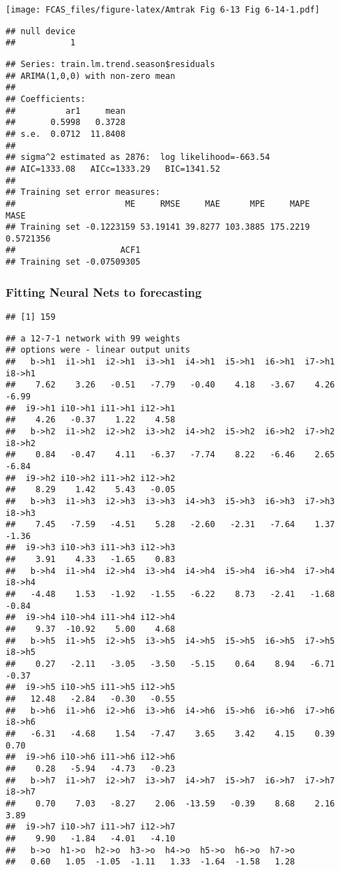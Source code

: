 \documentclass[]{article}
\begin{document}
\texttt{[image: FCAS\_files/figure-latex/Amtrak Fig 6-13 Fig 6-14-1.pdf]}

\begin{verbatim}
## null device 
##           1
\end{verbatim}

\begin{verbatim}
## Series: train.lm.trend.season$residuals 
## ARIMA(1,0,0) with non-zero mean 
## 
## Coefficients:
##          ar1     mean
##       0.5998   0.3728
## s.e.  0.0712  11.8408
## 
## sigma^2 estimated as 2876:  log likelihood=-663.54
## AIC=1333.08   AICc=1333.29   BIC=1341.52
## 
## Training set error measures:
##                      ME     RMSE     MAE      MPE     MAPE      MASE
## Training set -0.1223159 53.19141 39.8277 103.3885 175.2219 0.5721356
##                     ACF1
## Training set -0.07509305
\end{verbatim}

\subsubsection{Fitting Neural Nets to
forecasting}\label{fitting-neural-nets-to-forecasting}

\begin{verbatim}
## [1] 159
\end{verbatim}

\begin{verbatim}
## a 12-7-1 network with 99 weights
## options were - linear output units 
##   b->h1  i1->h1  i2->h1  i3->h1  i4->h1  i5->h1  i6->h1  i7->h1  i8->h1 
##    7.62    3.26   -0.51   -7.79   -0.40    4.18   -3.67    4.26   -6.99 
##  i9->h1 i10->h1 i11->h1 i12->h1 
##    4.26   -0.37    1.22    4.58 
##   b->h2  i1->h2  i2->h2  i3->h2  i4->h2  i5->h2  i6->h2  i7->h2  i8->h2 
##    0.84   -0.47    4.11   -6.37   -7.74    8.22   -6.46    2.65   -6.84 
##  i9->h2 i10->h2 i11->h2 i12->h2 
##    8.29    1.42    5.43   -0.05 
##   b->h3  i1->h3  i2->h3  i3->h3  i4->h3  i5->h3  i6->h3  i7->h3  i8->h3 
##    7.45   -7.59   -4.51    5.28   -2.60   -2.31   -7.64    1.37   -1.36 
##  i9->h3 i10->h3 i11->h3 i12->h3 
##    3.91    4.33   -1.65    0.83 
##   b->h4  i1->h4  i2->h4  i3->h4  i4->h4  i5->h4  i6->h4  i7->h4  i8->h4 
##   -4.48    1.53   -1.92   -1.55   -6.22    8.73   -2.41   -1.68   -0.84 
##  i9->h4 i10->h4 i11->h4 i12->h4 
##    9.37  -10.92    5.00    4.68 
##   b->h5  i1->h5  i2->h5  i3->h5  i4->h5  i5->h5  i6->h5  i7->h5  i8->h5 
##    0.27   -2.11   -3.05   -3.50   -5.15    0.64    8.94   -6.71   -0.37 
##  i9->h5 i10->h5 i11->h5 i12->h5 
##   12.48   -2.84   -0.30   -0.55 
##   b->h6  i1->h6  i2->h6  i3->h6  i4->h6  i5->h6  i6->h6  i7->h6  i8->h6 
##   -6.31   -4.68    1.54   -7.47    3.65    3.42    4.15    0.39    0.70 
##  i9->h6 i10->h6 i11->h6 i12->h6 
##    0.28   -5.94   -4.73   -0.23 
##   b->h7  i1->h7  i2->h7  i3->h7  i4->h7  i5->h7  i6->h7  i7->h7  i8->h7 
##    0.70    7.03   -8.27    2.06  -13.59   -0.39    8.68    2.16    3.89 
##  i9->h7 i10->h7 i11->h7 i12->h7 
##    9.90   -1.84   -4.01   -4.10 
##   b->o  h1->o  h2->o  h3->o  h4->o  h5->o  h6->o  h7->o 
##   0.60   1.05  -1.05  -1.11   1.33  -1.64  -1.58   1.28
\end{verbatim}
\end{document}
